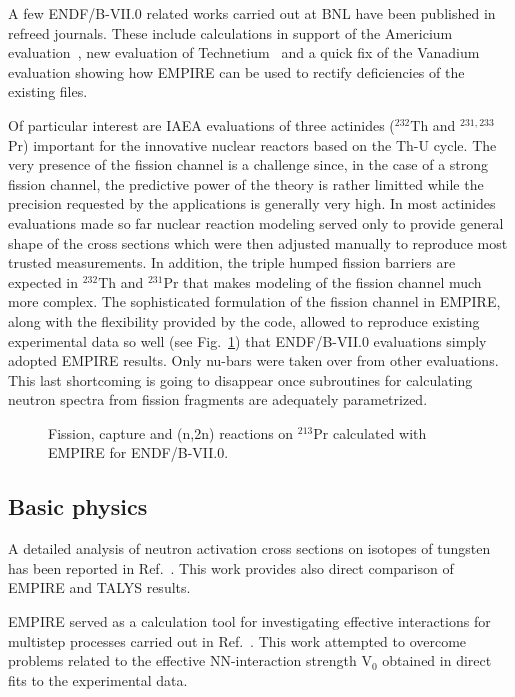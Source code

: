 \documentclass[twocolumn,amsmath,amssymb,10pt,groupedaddress,letter]{revtex4}
\begin{document}
A few ENDF/B-VII.0 related works carried out at BNL have been published in refreed journals. These include calculations in support of the  Americium evaluation~\cite{Rochman:06a}, new evaluation of Technetium~\cite{Rochman:07c} and a quick fix of the Vanadium~\cite{Rochman:06b} evaluation showing how EMPIRE can be used to rectify deficiencies of the existing files.

Of particular interest are IAEA evaluations of three actinides ($^{232}$Th and $^{231,233}$Pr) important for the innovative nuclear reactors based on the Th-U cycle. The very presence of the fission channel is a challenge since, in the case of a strong fission channel, the predictive power of the theory  is rather limitted while the precision requested by the applications is generally very high. In most actinides evaluations made so far nuclear reaction modeling served only to provide general shape of the cross sections which were then adjusted manually to reproduce most trusted measurements. In addition, the triple humped fission barriers are expected in $^{232}$Th and $^{231}$Pr that makes modeling of the fission channel much more complex. The sophisticated formulation of the fission channel in EMPIRE, along with the flexibility provided by the code, allowed to reproduce existing experimental data so well (see Fig.~\ref{231Pr}) that ENDF/B-VII.0 evaluations simply adopted EMPIRE results. Only nu-bars were taken over from other evaluations. This last shortcoming is going to disappear once subroutines for calculating neutron spectra from fission fragments are adequately parametrized.

\begin{figure}[htbp]
\caption{\label{231Pr} Fission, capture and (n,2n) reactions on $^{213}$Pr calculated with EMPIRE for ENDF/B-VII.0.}
\end{figure}


\subsection{Basic physics}
A detailed analysis of neutron activation cross sections on isotopes of tungsten has been reported in Ref.~\cite{Avrigeanu:06}. This work provides also direct comparison of EMPIRE and TALYS results.

EMPIRE served as a calculation tool for investigating effective interactions for multistep processes carried out in Ref.~\cite{avrigeanu2001eim}. This work attempted to overcome problems related to the effective NN-interaction strength V$_0$ obtained in direct fits to the experimental data.
\end{document}
